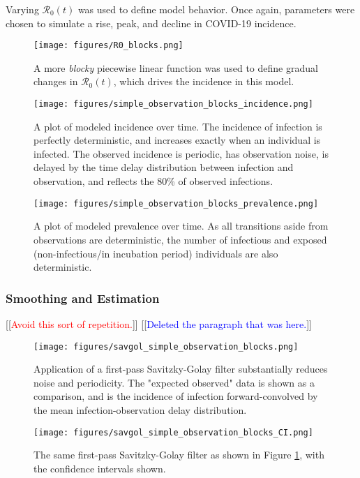 \documentclass{article}
\newcommand{\nR}{\mathcal{R}}
\newcommand{\jd}[1]{[[\textcolor{red}{#1}]]}  \newcommand{\msComment}[1]{[[\textcolor{blue}{#1}]]}
\newcommand{\jd}[1]{} \newcommand{\msComment}[1]{}
\begin{document}
Varying $\nR_0(t)$ was used to define model behavior. Once again, parameters were chosen to simulate a rise, peak, and decline in COVID-19 incidence.

\begin{figure}[h!]
\centering
\texttt{[image: figures/R0\_blocks.png]}
\caption{A more \emph{blocky} piecewise linear function was used to define gradual changes in $\nR_0(t)$, which drives the incidence in this model.}

\end{figure}

\clearpage
\begin{figure}[h!]
\centering
\texttt{[image: figures/simple\_observation\_blocks\_incidence.png]}
\caption{A plot of modeled incidence over time. The incidence of infection is perfectly deterministic, and increases exactly when an individual is infected. The observed incidence is periodic, has observation noise, is delayed by the time delay distribution between infection and observation, and reflects the 80\% of observed infections.}
\end{figure}

\begin{figure}[h!]
\centering
\texttt{[image: figures/simple\_observation\_blocks\_prevalence.png]}
\caption{A plot of modeled prevalence over time. As all transitions aside from observations are deterministic, the number of infectious and exposed (non-infectious/in incubation period) individuals are also deterministic.}
\end{figure}

\subsubsection{Smoothing and Estimation}

\jd{Avoid this sort of repetition.} \msComment{Deleted the paragraph that was here.}

\begin{figure}[h!]
\centering
\texttt{[image: figures/savgol\_simple\_observation\_blocks.png]}
\caption{Application of a first-pass Savitzky-Golay filter substantially reduces noise and periodicity. The "expected observed" data is shown as a comparison, and is the incidence of infection forward-convolved by the mean infection-observation delay distribution.}
\label{SGnoCIBlocks}
\end{figure}

\begin{figure}[h!]
\centering
\texttt{[image: figures/savgol\_simple\_observation\_blocks\_CI.png]}
\caption{The same first-pass Savitzky-Golay filter as shown in Figure \ref{SGnoCIBlocks}, with the confidence intervals shown.} 

\end{figure}
\end{document}
